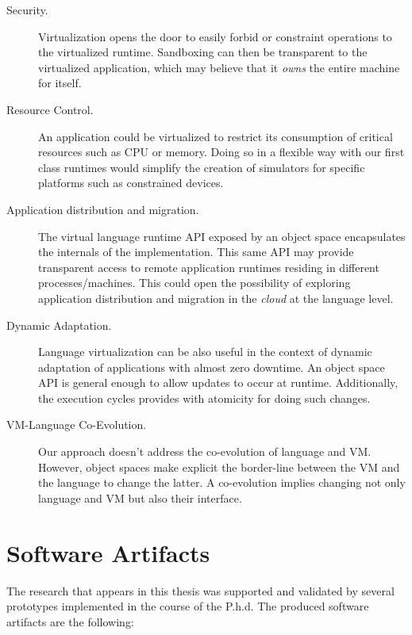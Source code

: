 \begin{description}

\item[Security.] Virtualization opens the door to easily forbid or constraint operations to the virtualized runtime. Sandboxing can then be transparent to the virtualized application, which may believe that it \emph{owns} the entire machine for itself.

\item[Resource Control.] An application could be virtualized to restrict its consumption of critical resources such as CPU or memory. Doing so in a flexible way with our first class runtimes would simplify \eg the creation of simulators for specific platforms such as constrained devices.

\item[Application distribution and migration.] The virtual language runtime API exposed by an object space encapsulates the internals of the implementation. This same API may provide transparent access to remote application runtimes residing in different processes/machines. This could open the possibility of exploring application distribution and migration in the \emph{cloud} at the language level.

\item[Dynamic Adaptation.] Language virtualization can be also useful in the context of dynamic adaptation of applications with almost zero downtime. An object space API is general enough to allow updates to occur at runtime. Additionally, the execution cycles provides with atomicity for doing such changes.

\item[VM-Language Co-Evolution.] Our approach doesn't address the co-evolution of language and VM. However, object spaces make explicit the border-line between the VM and the language to change the latter. A co-evolution implies changing not only language and VM but also their interface.

\end{description}

\section{Software Artifacts}

The research that appears in this thesis was supported and validated by several prototypes implemented in the course of the P.h.d. The produced software artifacts are the following:

